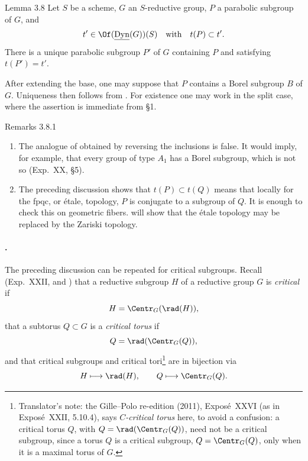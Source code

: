 \begin{sgastatement}{Lemma 3.8}
Let \(S\) be a scheme, \(G\) an \(S\)-reductive group, \(P\) a parabolic
subgroup of \(G\), and
\[
 t'\in\Of(\underline{\operatorname{Dyn}}(G))(S)
\quad\text{with}\quad
 t(P)\subset t'.
\]
There is a unique parabolic subgroup \(P'\) of \(G\) containing \(P\)
and satisfying \(t(P')=t'\).
\end{sgastatement}

After extending the base, one may suppose that \(P\) contains a Borel
subgroup \(B\) of \(G\).  Uniqueness then follows from .  For
existence one may work in the split case, where the assertion is immediate
from §1.

\begin{sgastatement}{Remarks 3.8.1}
\begin{enumerate}[label=\textup{(\roman*)}]
\item The analogue of  obtained by reversing the inclusions is false.
It would imply, for example, that every group of type \(A_1\) has a Borel
subgroup, which is not so \textup{(Exp.\ XX, §5)}.
\item The preceding discussion shows that \(t(P)\subset t(Q)\) means that
locally for the fpqc, or étale, topology, \(P\) is conjugate to a subgroup
of \(Q\).  It is enough to check this on geometric fibers.  
will show that the étale topology may be replaced by the Zariski topology.
\end{enumerate}
\end{sgastatement}

\paragraph{.}
The preceding discussion can be repeated for critical subgroups.  Recall
(Exp.\ XXII,  and ) that a reductive subgroup \(H\) of a
reductive group \(G\) is \emph{critical} if
\[
 H=\Centr_G(\rad(H)),
\]
that a subtorus \(Q\subset G\) is a \emph{critical torus} if
\[
 Q=\rad(\Centr_G(Q)),
\]
and that critical subgroups and critical tori\footnote{Translator's note: the Gille--Polo re-edition (2011), Exposé~XXVI (as in
Exposé~XXII, 5.10.4), says \emph{\(C\)-critical torus} here, to avoid a
confusion: a critical torus \(Q\), with \(Q=\rad(\Centr_G(Q))\), need not be
a critical subgroup, since a torus \(Q\) is a critical subgroup,
\(Q=\Centr_G(Q)\), only when it is a maximal torus of \(G\).} are in bijection via
\[
 H\longmapsto\rad(H),
 \qquad
 Q\longmapsto\Centr_G(Q).
\]


